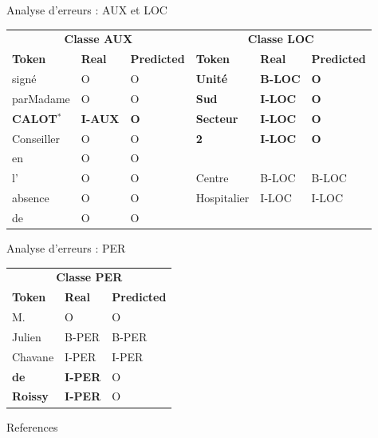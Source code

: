 \documentclass[10pt]{beamer}
\begin{document}
\appendix

\begin{frame}{Analyse d'erreurs : AUX et LOC}
\begin{tabular}{@{}lll|lll@{}}
	\toprule
	\multicolumn{3}{c}{\textbf{Classe AUX}} &  \multicolumn{3}{c}{\textbf{Classe LOC}} \\
	\textbf{Token}    & \textbf{Real} & \textbf{Predicted} & \textbf{Token}    & \textbf{Real} & \textbf{Predicted} \\ \midrule
	signé             & O                 & O                      & \textbf{Unité}                & \textbf{B-LOC}             & \textbf{O}                  \\
	parMadame         & O                 & O                      & \textbf{Sud}            & \textbf{I-LOC}             & \textbf{O}                  \\
	\textbf{CALOT$^*$}    & \textbf{I-AUX}    & \textbf{O}             & \textbf{Secteur}       & \textbf{I-LOC}    & \textbf{O}             \\
	Conseiller        & O                 & O                      & \textbf{2}    & \textbf{I-LOC}    & \textbf{O}             \\
	en                & O                 & O                      & 	               &                   &                        \\
	l'                & O                 & O                      & Centre                & B-LOC                 & B-LOC                      \\
	absence           & O                 & O                      & Hospitalier             & I-LOC                 & I-LOC                      \\
	de                & O                 & O                      &                   &                   &                        \\ \bottomrule
\end{tabular}
\end{frame}

\begin{frame}{Analyse d'erreurs : PER}
\begin{center}


\begin{tabular}{@{}lll@{}}
	\toprule
	\multicolumn{3}{c}{\textbf{Classe PER}}\\
	\textbf{Token}    & \textbf{Real} & \textbf{Predicted}  \\ \midrule
	M.             & O                 & O                      \\
	Julien         & B-PER                 & B-PER                      \\
	Chavane    & I-PER    & I-PER         \\
	\textbf{de}        & \textbf{I-PER}                 & O                      \\
	\textbf{Roissy}                & \textbf{I-PER}                 & O                      \\ \bottomrule
\end{tabular}
\end{center}
\end{frame}

\begin{frame}[allowframebreaks]{References}

  
  

\end{frame}
\end{document}
